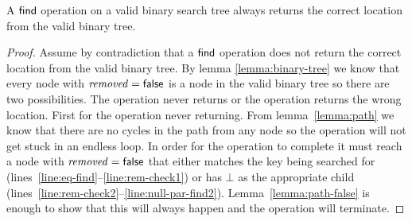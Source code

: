 \begin{lemma}
\label{lemma:find}
A $\act{find}$ operation on a valid binary search tree always returns the correct location from the valid binary tree.
\end{lemma}
\begin{proof}
Assume by contradiction that a $\act{find}$ operation does not return the correct location from the valid binary tree.
By lemma \ref{lemma:binary-tree} we know that every node with $\ms{removed}=\lit{false}$ is a node in the valid binary tree so
there are two possibilities.
The operation never returns or the operation returns the wrong location.
First for the operation never returning.
From lemma~\ref{lemma:path} we know that there are no cycles in the path from any node so the operation will not get stuck in an endless loop.
In order for the operation to complete it must reach a node with $\ms{removed}=\lit{false}$ that either matches the key being searched for (lines~\ref{line:eq-find}--\ref{line:rem-check1}) or
has $\bot$ as the appropriate child (lines~\ref{line:rem-check2}--\ref{line:null-par-find2}).
Lemma~\ref{lemma:path-false} is enough to show that this will always happen and the operation will terminate.


\end{proof}
